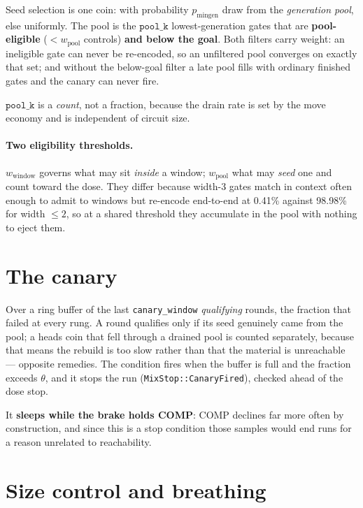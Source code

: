 \documentclass[11pt]{article}
\begin{document}
Seed selection is one coin: with probability $p_{\text{mingen}}$ draw from the
\emph{generation pool}, else uniformly. The pool is the
$\texttt{pool_k}$ lowest-generation gates that are \textbf{pool-eligible}
($< w_{\text{pool}}$ controls) \textbf{and below the goal}. Both filters carry
weight: an ineligible gate can never be re-encoded, so an unfiltered pool
converges on exactly that set; and without the below-goal filter a late pool
fills with ordinary finished gates and the canary can never fire.

$\texttt{pool_k}$ is a \emph{count}, not a fraction, because the drain rate is
set by the move economy and is independent of circuit size.

\paragraph{Two eligibility thresholds.} $w_{\text{window}}$ governs what may sit
\emph{inside} a window; $w_{\text{pool}}$ what may \emph{seed} one and count
toward the dose. They differ because width-3 gates match in context often enough
to admit to windows but re-encode end-to-end at 0.41\% against 98.98\% for width
$\le 2$, so at a shared threshold they accumulate in the pool with nothing to
eject them.

\section{The canary}

Over a ring buffer of the last \texttt{canary_window} \emph{qualifying} rounds,
the fraction that failed at every rung. A round qualifies only if its seed
genuinely came from the pool; a heads coin that fell through a drained pool is
counted separately, because that means the rebuild is too slow rather than that
the material is unreachable --- opposite remedies. The condition fires when the
buffer is full and the fraction exceeds $\theta$, and it stops the run
(\texttt{MixStop::CanaryFired}), checked ahead of the dose stop.

It \textbf{sleeps while the brake holds COMP}: COMP declines far more often by
construction, and since this is a stop condition those samples would end runs for
a reason unrelated to reachability.

\section{Size control and breathing}\label{sec:brake}
\end{document}
